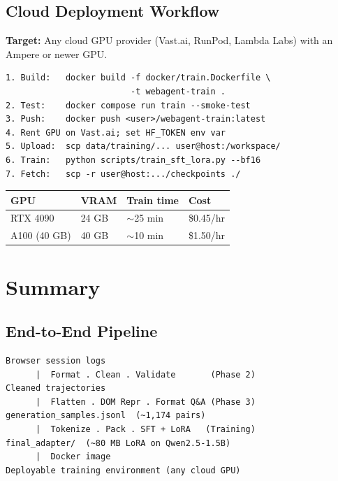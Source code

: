 \subsection{Cloud Deployment Workflow}
\begin{frame}[fragile,shrink=10]{\insertsubsection}
  \textbf{Target:} Any cloud GPU provider (Vast.ai, RunPod, Lambda Labs)
  with an Ampere or newer GPU.

\begin{verbatim}
1. Build:   docker build -f docker/train.Dockerfile \
                         -t webagent-train .
2. Test:    docker compose run train --smoke-test
3. Push:    docker push <user>/webagent-train:latest
4. Rent GPU on Vast.ai; set HF_TOKEN env var
5. Upload:  scp data/training/... user@host:/workspace/
6. Train:   python scripts/train_sft_lora.py --bf16
7. Fetch:   scp -r user@host:.../checkpoints ./
\end{verbatim}

  \small
  \begin{tabular}{p{} p{} p{} p{}}
    \textbf{GPU}     & \textbf{VRAM} & \textbf{Train time} & \textbf{Cost}   \\
    \hline
    RTX 4090         & 24 GB         & $\sim$25 min        & \$0.45/hr       \\
    A100 (40 GB)     & 40 GB         & $\sim$10 min        & \$1.50/hr       \\
  \end{tabular}
\end{frame}

\section{Summary}

\subsection{End-to-End Pipeline}
\begin{frame}[fragile]{\insertsubsection}
\begin{verbatim}
Browser session logs
      |  Format . Clean . Validate       (Phase 2)
Cleaned trajectories
      |  Flatten . DOM Repr . Format Q&A (Phase 3)
generation_samples.jsonl  (~1,174 pairs)
      |  Tokenize . Pack . SFT + LoRA   (Training)
final_adapter/  (~80 MB LoRA on Qwen2.5-1.5B)
      |  Docker image
Deployable training environment (any cloud GPU)
\end{verbatim}
\end{frame}

